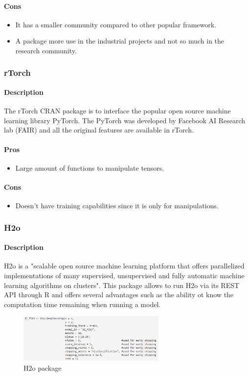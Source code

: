 \documentclass[letter]{article}\usepackage[]{graphicx}\usepackage[]{color}
\begin{document}
\paragraph{Cons}
\begin{itemize}
\item It has a smaller community compared to other popular framework.
\item A package more use in the industrial projects and not so much in the research community.
\end{itemize}


\subsubsection{rTorch}
\paragraph{Description}
The rTorch CRAN package is to interface the popular open source machine learning library PyTorch\cite{rTorch2019}. The PyTorch was developed by Facebook AI Research lab (FAIR) and all the original features are available in rTorch.
\paragraph{Pros}
\begin{itemize}
\item Large amount of functions to manipulate tensors.
\end{itemize}
\paragraph{Cons}
\begin{itemize}
\item Doesn't have training capabilities since it is only for manipulations.
\end{itemize}
\subsubsection{H2o}
\paragraph{Description}
H2o is a "scalable open source machine learning platform that offers parallelized implementations of many supervised, unsupervised and fully automatic machine learning algorithms on clusters". This package allows to run H2o via its REST API through R and offers several advantages such as the ability ot know the computation time remaining when running a model.
\begin{figure}[h]
    \centering
    \includegraphics[width=0.65\textwidth]{figure/h2o_package.png}
     \caption{H2o package}
\end{figure}
\end{document}
